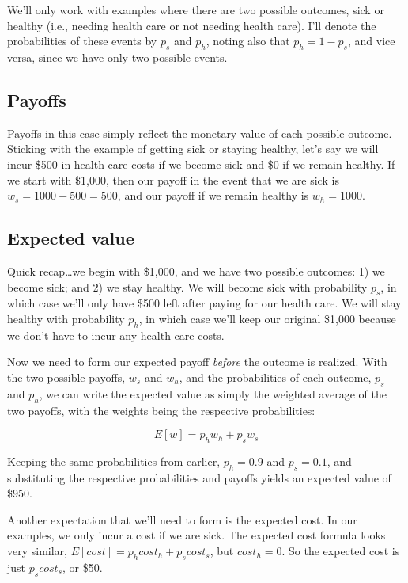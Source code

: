 \documentclass[
  letterpaper,
  DIV=11,
  numbers=noendperiod]{scrreport}
\theoremstyle{definition}
\theoremstyle{remark}
\begin{document}
We'll only work with examples where there are two possible outcomes,
sick or healthy (i.e., needing health care or not needing health care).
I'll denote the probabilities of these events by \(p_{s}\) and
\(p_{h}\), noting also that \(p_{h}=1-p_{s}\), and vice versa, since we
have only two possible events.

\hypertarget{payoffs}{%
\subsection*{Payoffs}\label{payoffs}}

Payoffs in this case simply reflect the monetary value of each possible
outcome. Sticking with the example of getting sick or staying healthy,
let's say we will incur \$500 in health care costs if we become sick and
\$0 if we remain healthy. If we start with \$1,000, then our payoff in
the event that we are sick is \(w_{s}=1000-500=500\), and our payoff if
we remain healthy is \(w_{h}=1000\).

\hypertarget{expected-value}{%
\subsection*{Expected value}\label{expected-value}}

Quick recap\ldots we begin with \$1,000, and we have two possible
outcomes: 1) we become sick; and 2) we stay healthy. We will become sick
with probability \(p_{s}\), in which case we'll only have \$500 left
after paying for our health care. We will stay healthy with probability
\(p_{h}\), in which case we'll keep our original \$1,000 because we
don't have to incur any health care costs.

Now we need to form our expected payoff \emph{before} the outcome is
realized. With the two possible payoffs, \(w_{s}\) and \(w_{h}\), and
the probabilities of each outcome, \(p_{s}\) and \(p_{h}\), we can write
the expected value as simply the weighted average of the two payoffs,
with the weights being the respective probabilities:

\[E[w] = p_{h}w_{h} + p_{s}w_{s}\]

Keeping the same probabilities from earlier, \(p_{h}=0.9\) and
\(p_{s}=0.1\), and substituting the respective probabilities and payoffs
yields an expected value of \$950.

Another expectation that we'll need to form is the expected cost. In our
examples, we only incur a cost if we are sick. The expected cost formula
looks very similar, \(E[cost]=p_{h}cost_{h} + p_{s}cost_{s}\), but
\(cost_{h}=0\). So the expected cost is just \(p_{s}cost_{s}\), or \$50.
\end{document}
